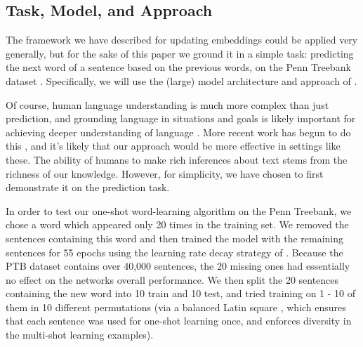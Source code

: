 \documentclass{article}
\begin{document}
\subsection{Task, Model, and Approach}
The framework we have described for updating embeddings could be applied very generally, but for the sake of this paper we ground it in a simple task: predicting the next word of a sentence based on the previous words, on the Penn Treebank dataset \citep{Marcus1993}. Specifically, we will use the (large) model architecture and approach of \citet{Zaremba2014a}. \par
Of course, human language understanding is much more complex than just prediction, and grounding language in situations and goals is likely important for achieving deeper understanding of language \citep{Gauthier2016}. More recent work has begun to do this \citep[e.g]{Hermann2017}, and it's likely that our approach would be more effective in settings like these. The ability of humans to make rich inferences about text stems from the richness of our knowledge. However, for simplicity, we have chosen to first demonstrate it on the prediction task. \par 
In order to test our one-shot word-learning algorithm on the Penn Treebank, we chose a word which appeared only 20 times in the training set. We removed the sentences containing this word and then trained the model with the remaining sentences for 55 epochs using the learning rate decay strategy of \citet{Zaremba2014a}. Because the PTB dataset contains over 40,000 sentences, the 20 missing ones had essentially no effect on the networks overall performance. We then split the 20 sentences containing the new word into 10 train and 10 test, and tried training on 1 - 10 of them in 10 different permutations (via a balanced Latin square \citep{Campbell1980}, which ensures that each sentence was used for one-shot learning once, and enforces diversity in the multi-shot learning examples). 
\end{document}
